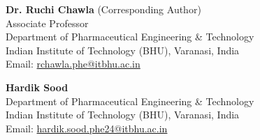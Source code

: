 \documentclass[11pt]{article}
\begin{document}
\vspace{1.5em}
\noindent
\textbf{Dr. Ruchi Chawla} (Corresponding Author) \\
Associate Professor \\
Department of Pharmaceutical Engineering \& Technology \\
Indian Institute of Technology (BHU), Varanasi, India \\
Email: \href{mailto:rchawla.phe@itbhu.ac.in}{rchawla.phe@itbhu.ac.in}

\vspace{1em}
\noindent
\textbf{Hardik Sood} \\
Department of Pharmaceutical Engineering \& Technology \\
Indian Institute of Technology (BHU), Varanasi, India \\
Email: \href{mailto:hardik.sood.phe24@itbhu.ac.in}{hardik.sood.phe24@itbhu.ac.in}
\end{document}
